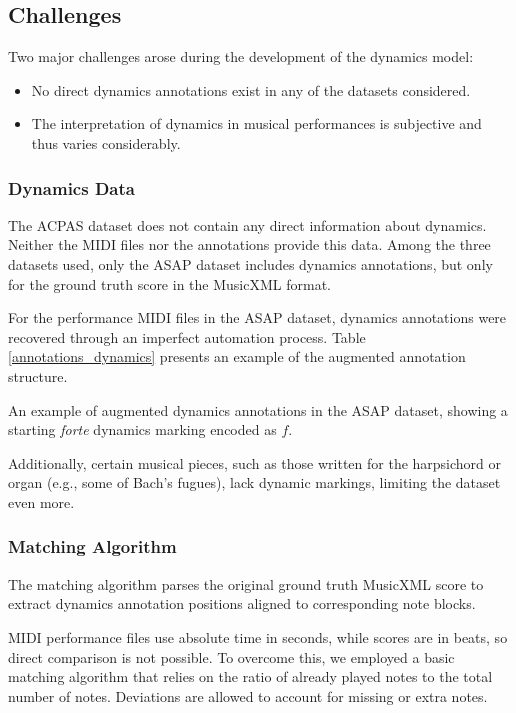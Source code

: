 \subsection{Challenges}

Two major challenges arose during the development of the dynamics model:
\begin{itemize} \item No direct dynamics annotations exist in any of the datasets considered. \item The interpretation of dynamics in musical performances is subjective and thus varies considerably. \end{itemize}

\subsubsection{Dynamics Data}

The ACPAS dataset does not contain any direct information about dynamics. Neither the MIDI files nor the annotations provide this data. Among the three datasets used, only the ASAP dataset includes dynamics annotations, but only for the ground truth score in the MusicXML format.

For the performance MIDI files in the ASAP dataset, dynamics annotations were recovered through an imperfect automation process. Table \ref{annotations_dynamics} presents an example of the augmented annotation structure.

\begin{table}[ht!]
\centering

\caption[Dynamics TSV annotations for the ASAP dataset.]{An example of augmented dynamics annotations in the ASAP dataset, showing a starting \emph{forte} dynamics marking encoded as $f$.}
\label{annotations_dynamics}
\end{table}

Additionally, certain musical pieces, such as those written for the harpsichord or organ (e.g., some of Bach's fugues), lack dynamic markings, limiting the dataset even more.

\subsubsection{Matching Algorithm}

The matching algorithm parses the original ground truth MusicXML score to extract dynamics annotation positions aligned to corresponding note blocks.

MIDI performance files use absolute time in seconds, while scores are in beats, so direct comparison is not possible. To overcome this, we employed a basic matching algorithm that relies on the ratio of already played notes to the total number of notes. Deviations are allowed to account for missing or extra notes.

